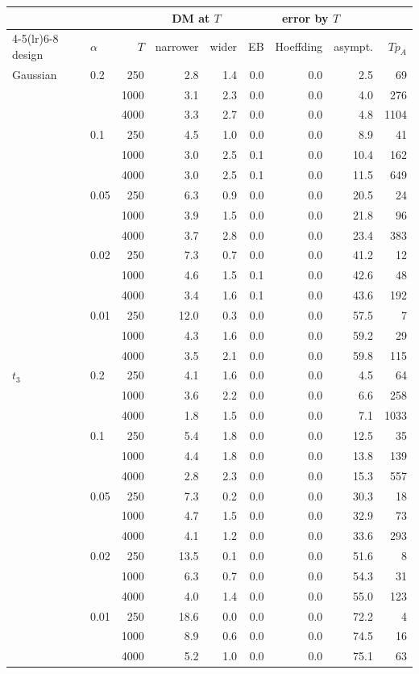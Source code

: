 \begin{tabular}{llrrrrrrr}
\toprule
 & & & \multicolumn{2}{c}{DM at $T$} & \multicolumn{3}{c}{error by $T$} & \\
\cmidrule(lr){4-5}\cmidrule(lr){6-8}
design & $\alpha$ & $T$ & narrower & wider & EB & Hoeffding & asympt. & $Tp_A$\\
\midrule
Gaussian & 0.2 & 250 & 2.8 & 1.4 & 0.0 & 0.0 & 2.5 & 69\\
 &  & 1000 & 3.1 & 2.3 & 0.0 & 0.0 & 4.0 & 276\\
 &  & 4000 & 3.3 & 2.7 & 0.0 & 0.0 & 4.8 & 1104\\
 & 0.1 & 250 & 4.5 & 1.0 & 0.0 & 0.0 & 8.9 & 41\\
 &  & 1000 & 3.0 & 2.5 & 0.1 & 0.0 & 10.4 & 162\\
 &  & 4000 & 3.0 & 2.5 & 0.1 & 0.0 & 11.5 & 649\\
 & 0.05 & 250 & 6.3 & 0.9 & 0.0 & 0.0 & 20.5 & 24\\
 &  & 1000 & 3.9 & 1.5 & 0.0 & 0.0 & 21.8 & 96\\
 &  & 4000 & 3.7 & 2.8 & 0.0 & 0.0 & 23.4 & 383\\
 & 0.02 & 250 & 7.3 & 0.7 & 0.0 & 0.0 & 41.2 & 12\\
 &  & 1000 & 4.6 & 1.5 & 0.1 & 0.0 & 42.6 & 48\\
 &  & 4000 & 3.4 & 1.6 & 0.1 & 0.0 & 43.6 & 192\\
 & 0.01 & 250 & 12.0 & 0.3 & 0.0 & 0.0 & 57.5 & 7\\
 &  & 1000 & 4.3 & 1.6 & 0.0 & 0.0 & 59.2 & 29\\
 &  & 4000 & 3.5 & 2.1 & 0.0 & 0.0 & 59.8 & 115\\
\midrule
$t_3$ & 0.2 & 250 & 4.1 & 1.6 & 0.0 & 0.0 & 4.5 & 64\\
 &  & 1000 & 3.6 & 2.2 & 0.0 & 0.0 & 6.6 & 258\\
 &  & 4000 & 1.8 & 1.5 & 0.0 & 0.0 & 7.1 & 1033\\
 & 0.1 & 250 & 5.4 & 1.8 & 0.0 & 0.0 & 12.5 & 35\\
 &  & 1000 & 4.4 & 1.8 & 0.0 & 0.0 & 13.8 & 139\\
 &  & 4000 & 2.8 & 2.3 & 0.0 & 0.0 & 15.3 & 557\\
 & 0.05 & 250 & 7.3 & 0.2 & 0.0 & 0.0 & 30.3 & 18\\
 &  & 1000 & 4.7 & 1.5 & 0.0 & 0.0 & 32.9 & 73\\
 &  & 4000 & 4.1 & 1.2 & 0.0 & 0.0 & 33.6 & 293\\
 & 0.02 & 250 & 13.5 & 0.1 & 0.0 & 0.0 & 51.6 & 8\\
 &  & 1000 & 6.3 & 0.7 & 0.0 & 0.0 & 54.3 & 31\\
 &  & 4000 & 4.0 & 1.4 & 0.0 & 0.0 & 55.0 & 123\\
 & 0.01 & 250 & 18.6 & 0.0 & 0.0 & 0.0 & 72.2 & 4\\
 &  & 1000 & 8.9 & 0.6 & 0.0 & 0.0 & 74.5 & 16\\
 &  & 4000 & 5.2 & 1.0 & 0.0 & 0.0 & 75.1 & 63\\
\bottomrule
\end{tabular}

